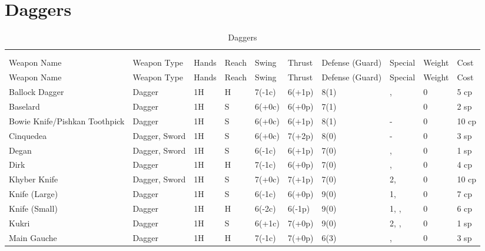 \documentclass[oneside,11pt,english]{book}
\begin{document}
\section{Daggers}\vspace{-15pt}
\begin{longtabu} to 1\linewidth {X[2,l]XX[-1,c]X[-1,c]XXX[-1,c]X[2,l]X[-3,c]X[-3,r]}
	\captionsetup{labelformat=blank,textformat=empty}
	\caption{Daggers}\vspace{-15pt}\\
	\label{tab:Daggers List}\\
		Weapon Name						&Weapon Type	&Hands&Reach&Swing&Thrust&Defense (Guard)&Special						&Weight	&Cost\\\toprule\endfirsthead
Weapon Name						&Weapon Type	&Hands&Reach&Swing&Thrust&Defense (Guard)&Special						&Weight	&Cost\\\toprule\endhead
Ballock Dagger					&Dagger			&1H	&H	&7(-1c)	&6(+1p)	&8(1)	&, 				&0	&5 cp\\
Baselard						&Dagger			&1H	&S	&6(+0c)	&6(+0p)	&7(1)	&							&0	&2 sp\\
Bowie Knife/Pishkan Toothpick	&Dagger			&1H	&S	&6(+0c)	&6(+1p)	&8(1)	&-										&0	&10 cp\\
Cinquedea						&Dagger, Sword	&1H	&S	&6(+0c)	&7(+2p)	&8(0)	&-										&0	&3 sp\\
Degan							&Dagger, Sword	&1H	&S	&6(-1c)	&6(+1p)	&7(0)	&, 				&0	&1 sp\\
Dirk							&Dagger			&1H	&H	&7(-1c)	&6(+0p)	&7(0)	&, 				&0	&4 cp\\
Khyber Knife					&Dagger, Sword	&1H	&S	&7(+0c)	&7(+1p)	&7(0)	& 2, 						&0	&10 cp\\
Knife (Large)					&Dagger			&1H	&S	&6(-1c)	&6(+0p)	&9(0)	& 1, 					&0	&7 cp\\
Knife (Small)					&Dagger			&1H	&H	&6(-2c)	&6(-1p)	&9(0)	& 1, , 		&0	&6 cp\\
Kukri							&Dagger			&1H	&S	&6(+1c)	&7(+0p)	&9(0)	& 2, , 		&0	&1 sp\\
Main Gauche						&Dagger			&1H	&H	&7(-1c)	&7(+0p)	&6(3)	&, 			&0	&3 sp\\

\end{longtabu}
\end{document}
